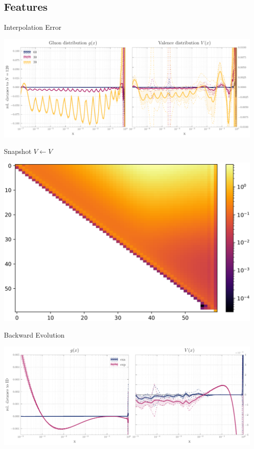 \documentclass[9pt]{beamer}
\begin{document}
\subsection{Features}
\begin{frame}{\eko{} Interpolation Error}
	\begin{center}
		\includegraphics[width=\linewidth]{interpolation-int-ratio.pdf}
	\end{center}
\end{frame}
\begin{frame}{\eko{} Snapshot $V\leftarrow V$}
	\begin{center}
		\includegraphics[width=\linewidth]{VvV.png}
	\end{center}
\end{frame}
\begin{frame}{\eko{} Backward Evolution}
	\begin{center}
		\includegraphics[width=\linewidth]{closure_test.pdf}
	\end{center}
\end{frame}
\end{document}
